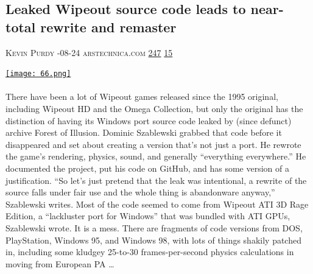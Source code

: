 \documentclass[10pt,a4paper]{article}
\begin{document}
\begin{multicols}{2}
\raggedcolumns
\noindent\begin{minipage}{\linewidth}
\medskip
\subsection{Leaked Wipeout source code leads to near-total rewrite and remaster}
\textsc{\footnotesize
{\scriptsize\faUser}\space 
Kevin Purdy 
{\scriptsize\faCalendar}-08-24 
{\scriptsize\faGlobe}\space 
arstechnica.com 
{\scriptsize\faThumbsOUp}\space 
\href{http://news.ycombinator.com/item?id=37262258\&utm\_term=comment}{247} 
{\scriptsize\faComments}\space 
\href{http://news.ycombinator.com/item?id=37262258\&utm\_term=comment}{15} 
}
\par\medskip\noindent
\href{https://arstechnica.com/gaming/2023/08/developer-rewrites-original-wipeout-from-abysmal-leaked-windows-source/?utm\_source=hackernewsletter\&utm\_medium=email\&utm\_term=fun}{
    \texttt{[image: 66.png]}
}
\end{minipage}
\paragraph{}
There have been a lot of Wipeout games released since the 1995 original, including Wipeout HD and the Omega Collection, but only the original has the distinction of having its Windows port source code leaked by (since defunct) archive Forest of Illusion.
Dominic Szablewski grabbed that code before it disappeared and set about creating a version that’s not just a port. He rewrote the game’s rendering, physics, sound, and generally “everything everywhere.” He documented the project, put his code on GitHub, and has some version of a justification. “So let's just pretend that the leak was intentional, a rewrite of the source falls under fair use and the whole thing is abandonware anyway,” Szablewski writes.
Most of the code seemed to come from Wipeout ATI 3D Rage Edition, a “lackluster port for Windows” that was bundled with ATI GPUs, Szablewski wrote. It is a mess. There are fragments of code versions from DOS, PlayStation, Windows 95, and Windows 98, with lots of things shakily patched in, including some kludgey 25-to-30 frames-per-second physics calculations in moving from European PA
\dots\par
\noindent\begin{minipage}{\linewidth}
\medskip

\end{minipage}
\end{multicols}
\end{document}
